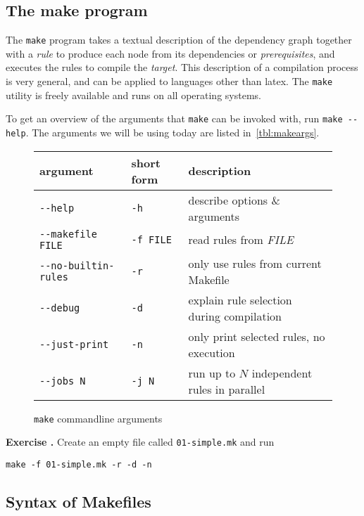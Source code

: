 \documentclass[a4paper,11pt]{article}
\newcounter{exercisectr}
\newcommand{\exercise}[1]{%
\par%
\stepcounter{exercisectr}%
\vspace{\baselineskip}%
\noindent\textbf{Exercise \arabic{exercisectr}\ifthenelse{\equal{#1}{}}{}{ : #1}%
.}\quad%
}
\begin{document}
\subsection{The make program}
\label{sec:make-program}

The \texttt{make} program takes a textual description of the dependency graph together with a \emph{rule} to produce each node from its dependencies or \emph{prerequisites}, and executes the rules to compile the \emph{target}. This description of a compilation process is very general, and can be applied to languages other than latex. The \texttt{make} utility is freely available and runs on all operating systems.

To get an overview of the arguments that \texttt{make} can be invoked with, run \verb|make --help|. The arguments we will be using today are listed in~\autoref{tbl:makeargs}.
%
\begin{figure}[h]
  \centering
  \begin{tabular}[h]{l l l}
    argument & short form & description \\ \hline
    \verb|--help| & \verb|-h| & describe options \& arguments \\
    \verb|--makefile FILE| & \verb|-f FILE| & read rules from \emph{FILE} \\
    \verb|--no-builtin-rules| & \verb|-r| & only use rules from current Makefile \\
    \verb|--debug| & \verb|-d| & explain rule selection during compilation \\
    \verb|--just-print| & \verb|-n| & only print selected rules, no  execution \\
    \verb|--jobs N| & \verb|-j N| & run up to $N$ independent rules in parallel
  \end{tabular}
  \caption{\texttt{make} commandline arguments}
  \label{tbl:makeargs}
\end{figure}
%

\exercise{} Create an empty file called \verb|01-simple.mk| and run
\begin{verbatim}
make -f 01-simple.mk -r -d -n
\end{verbatim}


\subsection{Syntax of Makefiles}
\label{sec:syntax-makefiles}
\end{document}
